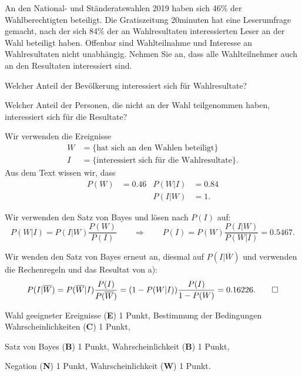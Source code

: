 An den National- und Ständeratswahlen 2019 haben sich 46\% der 
Wahlberechtigten beteiligt.
Die Gratiszeitung 20minuten hat eine Leserumfrage gemacht, nach der sich
84\% der an Wahlresultaten interessierten Leser an der Wahl beteiligt haben.
Offenbar sind Wahlteilnahme und Interesse an Wahlresultaten nicht unabhängig.
Nehmen Sie an, dass alle Wahlteilnehmer auch an den Resultaten interessiert
sind.
\begin{teilaufgaben}
\item
Welcher Anteil der Bevölkerung interessiert sich für Wahlresultate?
\item 
Welcher Anteil der Personen, die nicht an der Wahl teilgenommen haben,
interessiert sich für die Resultate?
\end{teilaufgaben}


\begin{loesung}
Wir verwenden die Ereignisse
\begin{align*}
W&=\{\text{hat sich an den Wahlen beteiligt}\}
\\
I&=\{\text{interessiert sich für die Wahlresultate}\}.
\end{align*}
Aus dem Text wissen wir, dass
\begin{align*}
P(W)&=0.46&P(W|I)&=0.84\\
    &     &P(I|W)&=1.
\end{align*}
\begin{teilaufgaben}
\item
Wir verwenden den Satz von Bayes und lösen nach $P(I)$ auf:
\[
P(W|I)=P(I|W)\frac{P(W)}{P(I)}
\qquad\Rightarrow\qquad
P(I)=P(W) \frac{P(I|W)}{P(W|I)}
=
0.5467.
\]
\item
Wir wenden den Satz von Bayes erneut an, diesmal auf $P(I|\overline{W})$ und
verwenden die Rechenregeln und das Resultat von a):
\[
P(I|\overline{W})
=
P(\overline{W}|I)\frac{P(I)}{P(\overline{W})}
=
(1-P(W|I))\frac{P(I)}{1-P(W)} = 0.16226.
\qedhere
\]
\end{teilaufgaben}
\end{loesung}

\begin{bewertung}
Wahl geeigneter Ereignisse ({\bf E}) 1 Punkt,
Bestimmung der Bedingungen Wahrscheinlichkeiten ({\bf C}) 1 Punkt,
\begin{teilaufgaben}
\item
Satz von Bayes ({\bf B}) 1 Punkt,
Wahrscheinlichkeit ({\bf B}) 1 Punkt,
\item
Negation ({\bf N}) 1 Punkt,
Wahrscheinlichkeit ({\bf W}) 1 Punkt.
\end{teilaufgaben}
\end{bewertung}

